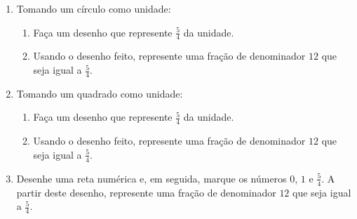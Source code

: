 \documentclass[10 pt,usenames,dvipsnames, oneside]{article}
\begin{document}
\begin{enumerate}
  \item     Tomando um círculo como unidade:
\begin{enumerate}
  \item Faça um desenho que represente     $\frac{5}{4}$ da unidade.
  \item Usando o desenho feito, represente uma fração de denominador     $12$ que seja igual a     $\frac{5}{4}$.
\end{enumerate}
  \item     Tomando um quadrado como unidade:
  \begin{enumerate}
  \item Faça um desenho que represente     $\frac{5}{4}$ da unidade.
  \item Usando o desenho feito, represente uma fração de denominador     $12$ que seja igual a     $\frac{5}{4}$.
  \end{enumerate}
\item     Desenhe uma reta numérica e, em seguida, marque os números     $0$,     $1$ e     $\frac{5}{4}$. A partir deste desenho, represente uma fração de denominador     $12$ que seja igual a     $\frac{5}{4}$.
\end{enumerate} %
\end{document}
